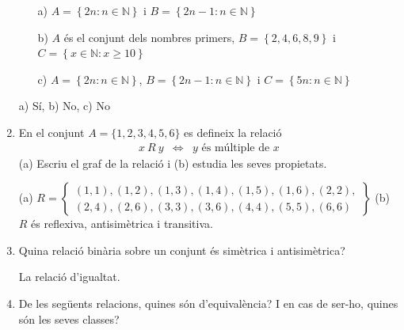 \begin{enumerate}
\begin{exercici}
\begin{enumerate}
\item[a)] $A=\left\{ 2n:n\in \mathbb{N}\right\} $ i $B=\left\{ 2n-1:n\in
\mathbb{N}\right\} $

\item[b)] $A$ és el conjunt dels nombres primers, $B=\left\{
2,4,6,8,9\right\} $ i $C=\left\{ x\in \mathbb{N}:x\geq 10\right\} $

\item[c)] $A=\left\{ 2n:n\in \mathbb{N}\right\} $, $B=\left\{ 2n-1:n\in
\mathbb{N}\right\} $ i $C=\left\{ 5n:n\in \mathbb{N}\right\} $
\end{enumerate}
\end{exercici}

\begin{indicacio}
a) Sí, b) No, c) No
\end{indicacio}

\item
\begin{exercici}
En el conjunt $A=\{1,2,3,4,5,6\}$ es defineix la relació%
\begin{equation*}
\begin{array}{ccc}
x~R~y & \Longleftrightarrow & y\text{ és múltiple de }x%
\end{array}%
\end{equation*}%
(a) Escriu el graf de la relació i (b) estudia les seves propietats.
\end{exercici}

\begin{indicacio}
(a) $R=\left\{
\begin{array}{c}
(1,1),(1,2),(1,3),(1,4),(1,5),(1,6),(2,2), \\
(2,4),(2,6),(3,3),(3,6),(4,4),(5,5),(6,6)%
\end{array}%
\right\} $ (b) $R$ és reflexiva, antisimètrica i transitiva.
\end{indicacio}

\item
\begin{exercici}
Quina relació binària sobre un conjunt és simètrica i
antisimètrica?
\end{exercici}

\begin{indicacio}
La relació d'igualtat.
\end{indicacio}

\item
\begin{exercici}
De les següents relacions, quines són d'equivalència? I en
cas de ser-ho, quines són les seves classes?


\end{exercici}
\end{enumerate}
